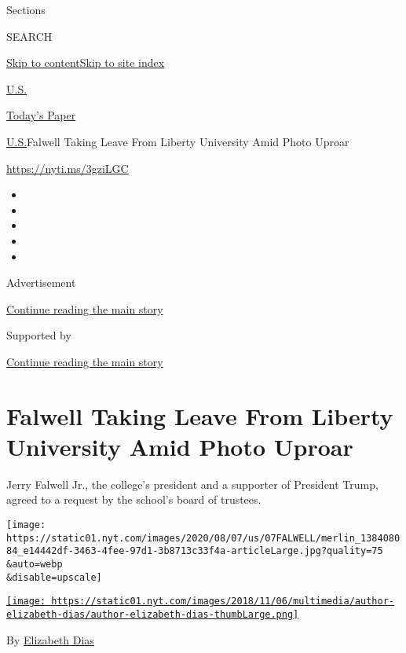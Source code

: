 Sections

SEARCH

\protect\hyperlink{site-content}{Skip to
content}\protect\hyperlink{site-index}{Skip to site index}

\href{https://www.nytimes.com/section/us}{U.S.}

\href{https://myaccount.nytimes.com/auth/login?response_type=cookie\&client_id=vi}{}

\href{https://www.nytimes.com/section/todayspaper}{Today's Paper}

\href{/section/us}{U.S.}\textbar{}Falwell Taking Leave From Liberty
University Amid Photo Uproar

\href{https://nyti.ms/3gziLGC}{https://nyti.ms/3gziLGC}

\begin{itemize}
\item
\item
\item
\item
\item
\end{itemize}

Advertisement

\protect\hyperlink{after-top}{Continue reading the main story}

Supported by

\protect\hyperlink{after-sponsor}{Continue reading the main story}

\hypertarget{falwell-taking-leave-from-liberty-university-amid-photo-uproar}{%
\section{Falwell Taking Leave From Liberty University Amid Photo
Uproar}\label{falwell-taking-leave-from-liberty-university-amid-photo-uproar}}

Jerry Falwell Jr., the college's president and a supporter of President
Trump, agreed to a request by the school's board of trustees.

\texttt{[image: https://static01.nyt.com/images/2020/08/07/us/07FALWELL/merlin\_138408084\_e14442df-3463-4fee-97d1-3b8713c33f4a-articleLarge.jpg?quality=75\\\&auto=webp\\\&disable=upscale]}

\href{https://www.nytimes.com/by/elizabeth-dias}{\texttt{[image: https://static01.nyt.com/images/2018/11/06/multimedia/author-elizabeth-dias/author-elizabeth-dias-thumbLarge.png]}}

By \href{https://www.nytimes.com/by/elizabeth-dias}{Elizabeth Dias}

